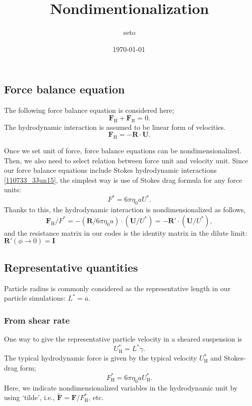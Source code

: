 \documentclass[fontsize=11pt]{scrartcl}
\title{Nondimentionalization}
\date{\shortdate\today \, \ampmtime }
\author{seto}
\begin{document}
\maketitle

\subsection*{Force balance equation}

The following force balance equation is considered here;
\begin{equation}
 \bm{F}_{\mathrm{H}} +  \bm{F}_{\mathrm{R}}  = 0.
\end{equation}
%
The hydrodynamic interaction is
assumed to be linear form of velocities.
%
\begin{equation}
 \bm{F}_{\mathrm{H}} = - \bm{R}\cdot\bm{U}.\label{110733_3Jun15}
\end{equation}

Once we set unit of force,
force balance equations can be nondimensionalized.
%
Then, we also need to select
relation between force unit and velocity unit.
%
Since our force balance equations include
Stokes  hydrodynamic interactions \eqref{110733_3Jun15},
the simplest way is use of Stokes drag formula
for any force units:
\begin{equation}
 F^{\ast} = 6 \pi \eta_{0} a U^{\ast}.
\end{equation}
%
Thanks to this,
the hydrodynamic interaction is nondimensionalized as follows,
\begin{equation}
 \bm{F}_{\mathrm{H}}/F^{\ast}
  = -(\bm{R}/6\pi\eta_0 a) \cdot (\bm{U}/U^{\ast})
     = -\bm{R}' \cdot (\bm{U}/U^{\ast}),
\end{equation}
%
and the resistance matrix in our codes
is the identity matrix
in the dilute limit: $\bm{R}'(\phi\to 0) = \bm{I}$

\subsection*{Representative quantities}

Particle radius is commonly considered
as the representative length in
our particle simulations: $L^{\ast} = a$.




\subsubsection*{From shear rate}

One way to give the representative particle velocity
in a sheared suspension is
\begin{equation}
U_{\mathrm{H}}^{\ast} = L^{\ast} \dot{\gamma}.
\end{equation}
%
%
The typical hydrodynamic force is given
by the typical velocity $U_{\mathrm{H}}^{\ast} $
and Stokes-drag form;
\begin{equation}
  F_{\mathrm{H}}^{\ast} = 6 \pi \eta_0 a U_{\mathrm{H}}^{\ast}.
\end{equation}
Here, we indicate nondimensionalized variables
in the hydrodynamic unit by using `tilde',
i.e.,
$\tilde{\bm{F}}  = \bm{F}/ F_{\mathrm{H}}^{\ast} $,
etc.
%
\end{document}
